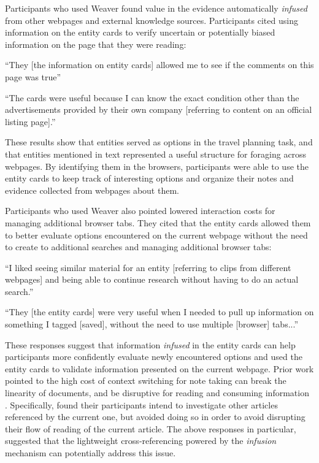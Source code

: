 \noindent Participants who used Weaver found value in the evidence automatically \emph{infused} from other webpages and external knowledge sources. Participants cited using information on the entity cards to verify uncertain or potentially biased information on the page that they were reading: 

\begin{tightquote}
``They [the information on entity cards] allowed me to see if the comments on this page was true''

``The cards were useful because I can know the exact condition other than the advertisements provided by their own company [referring to content on an official listing page].''
\end{tightquote}
 
These results show that entities served as options in the travel planning task, and that entities mentioned in text represented a useful structure for foraging across webpages. By identifying them in the browsers, participants were able to use the entity cards to keep track of interesting options and organize their notes and evidence collected from webpages about them.

Participants who used Weaver also pointed lowered interaction costs for managing additional browser tabs. They cited that the entity cards allowed them to better evaluate options encountered on the current webpage without the need to create to additional searches and managing additional browser tabs:

\begin{tightquote}
``I liked seeing similar material for an entity [referring to clips from different webpages] and being able to continue research without having to do an actual search.''

``They [the entity cards] were very useful when I needed to pull up information on something I tagged [saved], without the need to use multiple [browser] tabs...'' 
\end{tightquote}

\noindent These responses suggest that information \emph{infused} in the entity cards can help participants more confidently evaluate newly encountered options and used the entity cards to validate information presented on the current webpage.
Prior work pointed to the high cost of context switching for note taking can break the linearity of documents, and be disruptive for reading and consuming information \cite{chang2016supporting,tashman2011liquidtext,o1996towards}. Specifically, \cite{marshall1999introducing} found their participants intend to investigate other articles referenced by the current one, but avoided doing so in order to avoid disrupting their flow of reading of the current article.
The above responses in particular, suggested that the lightweight cross-referencing powered by the \emph{infusion} mechanism can potentially address this issue.


